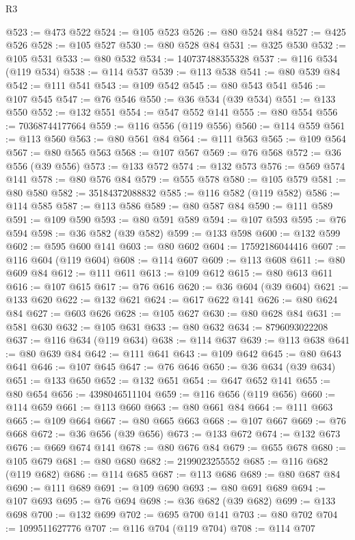 \begin{lexlean}{R3}
\begin{coremodule}
@523 := @473 @522
@524 := @105 @523
@526 := @80 @524 @84
@527 := @425 @526
@528 := @105 @527
@530 := @80 @528 @84
@531 := @325 @530
@532 := @105 @531
@533 := @80 @532
@534 := 140737488355328
@537 := @116 @534 (@119 @534)
@538 := @114 @537
@539 := @113 @538
@541 := @80 @539 @84
@542 := @111 @541
@543 := @109 @542
@545 := @80 @543 @541
@546 := @107 @545
@547 := @76 @546
@550 := @36 @534 (@39 @534)
@551 := @133 @550
@552 := @132 @551
@554 := @547 @552 @141
@555 := @80 @554
@556 := 70368744177664
@559 := @116 @556 (@119 @556)
@560 := @114 @559
@561 := @113 @560
@563 := @80 @561 @84
@564 := @111 @563
@565 := @109 @564
@567 := @80 @565 @563
@568 := @107 @567
@569 := @76 @568
@572 := @36 @556 (@39 @556)
@573 := @133 @572
@574 := @132 @573
@576 := @569 @574 @141
@578 := @80 @576 @84
@579 := @555 @578
@580 := @105 @579
@581 := @80 @580
@582 := 35184372088832
@585 := @116 @582 (@119 @582)
@586 := @114 @585
@587 := @113 @586
@589 := @80 @587 @84
@590 := @111 @589
@591 := @109 @590
@593 := @80 @591 @589
@594 := @107 @593
@595 := @76 @594
@598 := @36 @582 (@39 @582)
@599 := @133 @598
@600 := @132 @599
@602 := @595 @600 @141
@603 := @80 @602
@604 := 17592186044416
@607 := @116 @604 (@119 @604)
@608 := @114 @607
@609 := @113 @608
@611 := @80 @609 @84
@612 := @111 @611
@613 := @109 @612
@615 := @80 @613 @611
@616 := @107 @615
@617 := @76 @616
@620 := @36 @604 (@39 @604)
@621 := @133 @620
@622 := @132 @621
@624 := @617 @622 @141
@626 := @80 @624 @84
@627 := @603 @626
@628 := @105 @627
@630 := @80 @628 @84
@631 := @581 @630
@632 := @105 @631
@633 := @80 @632
@634 := 8796093022208
@637 := @116 @634 (@119 @634)
@638 := @114 @637
@639 := @113 @638
@641 := @80 @639 @84
@642 := @111 @641
@643 := @109 @642
@645 := @80 @643 @641
@646 := @107 @645
@647 := @76 @646
@650 := @36 @634 (@39 @634)
@651 := @133 @650
@652 := @132 @651
@654 := @647 @652 @141
@655 := @80 @654
@656 := 4398046511104
@659 := @116 @656 (@119 @656)
@660 := @114 @659
@661 := @113 @660
@663 := @80 @661 @84
@664 := @111 @663
@665 := @109 @664
@667 := @80 @665 @663
@668 := @107 @667
@669 := @76 @668
@672 := @36 @656 (@39 @656)
@673 := @133 @672
@674 := @132 @673
@676 := @669 @674 @141
@678 := @80 @676 @84
@679 := @655 @678
@680 := @105 @679
@681 := @80 @680
@682 := 2199023255552
@685 := @116 @682 (@119 @682)
@686 := @114 @685
@687 := @113 @686
@689 := @80 @687 @84
@690 := @111 @689
@691 := @109 @690
@693 := @80 @691 @689
@694 := @107 @693
@695 := @76 @694
@698 := @36 @682 (@39 @682)
@699 := @133 @698
@700 := @132 @699
@702 := @695 @700 @141
@703 := @80 @702
@704 := 1099511627776
@707 := @116 @704 (@119 @704)
@708 := @114 @707

\end{coremodule}
\end{lexlean}

